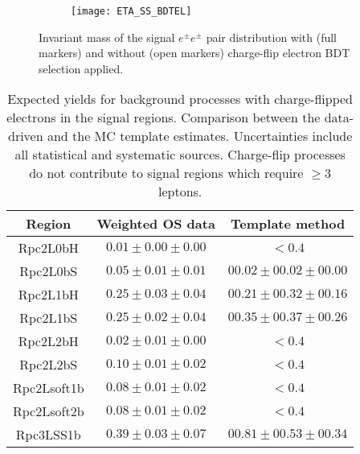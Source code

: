 \begin{figure}[htb!]
\centering
\begin{subfigure}[t]{0.66\textwidth}\texttt{[image: ETA\_SS\_BDTEL]}\end{subfigure}
\caption{Invariant mass of the signal $e^{\pm} e^{\pm}$ pair distribution with (full markers) and without (open markers) charge-flip electron BDT selection applied.
}
\label{fig:ETA_SS_BDTEL}
\end{figure}



\begin{table}[!htb]
\caption{Expected yields for background processes with charge-flipped electrons
in the signal regions. Comparison between the data-driven and the MC template
estimates.
Uncertainties include all statistical and systematic sources. 
Charge-flip processes do not contribute to signal regions which require $\ge 3$ leptons. 
}
\label{tab:chargeflip_sr_yields}
\centering
\begin{tabular}{|c||c|c|}\hline
 Region      &   Weighted OS data          &     Template method \\\hline
    Rpc2L0bH & $ 0.01 \pm  0.00 \pm  0.00$ & $<0.4$ \\
    Rpc2L0bS & $ 0.05 \pm  0.01 \pm  0.01$ & $ 00.02 \pm 00.02 \pm 00.00 $ \\
    Rpc2L1bH & $ 0.25 \pm  0.03 \pm  0.04$ & $ 00.21 \pm 00.32 \pm 00.16 $ \\
    Rpc2L1bS & $ 0.25 \pm  0.02 \pm  0.04$ & $ 00.35 \pm 00.37 \pm 00.26 $ \\
    Rpc2L2bH & $ 0.02 \pm  0.01 \pm  0.00$ & $<0.4$ \\
    Rpc2L2bS & $ 0.10 \pm  0.01 \pm  0.02$ & $<0.4$ \\
 Rpc2Lsoft1b & $ 0.08 \pm  0.01 \pm  0.02$ & $<0.4$ \\
 Rpc2Lsoft2b & $ 0.08 \pm  0.01 \pm  0.02$ & $<0.4$ \\
   Rpc3LSS1b & $ 0.39 \pm  0.03 \pm  0.07$ & $ 00.81 \pm 00.53 \pm 00.34 $ \\
\hline
\hline
\end{tabular}
\end{table}
